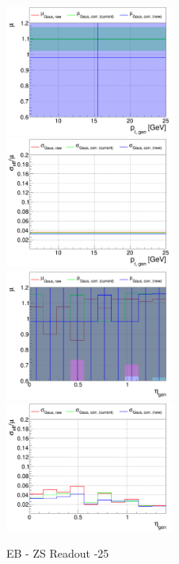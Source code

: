\begin{figure}
\includegraphics[width=0.495\textwidth]{./plots_pdf/ECAL_plots/plotsPU/EB/ZS/pdf/GENPT/EBZS_GENPT_0006_0025_MuOverBins.pdf}
\includegraphics[width=0.495\textwidth]{./plots_pdf/ECAL_plots/plotsPU/EB/ZS/pdf/GENPT/EBZS_GENPT_0006_0025_EffSigmaOverBins.pdf}
\includegraphics[width=0.495\textwidth]{./plots_pdf/ECAL_plots/plotsPU/EB/ZS/pdf/GENETA/EBZS_GENETA_0006_0025_MuOverBins.pdf}
\includegraphics[width=0.495\textwidth]{./plots_pdf/ECAL_plots/plotsPU/EB/ZS/pdf/GENETA/EBZS_GENETA_0006_0025_EffSigmaOverBins.pdf}
\caption{EB - ZS Readout -25}
\end{figure}





